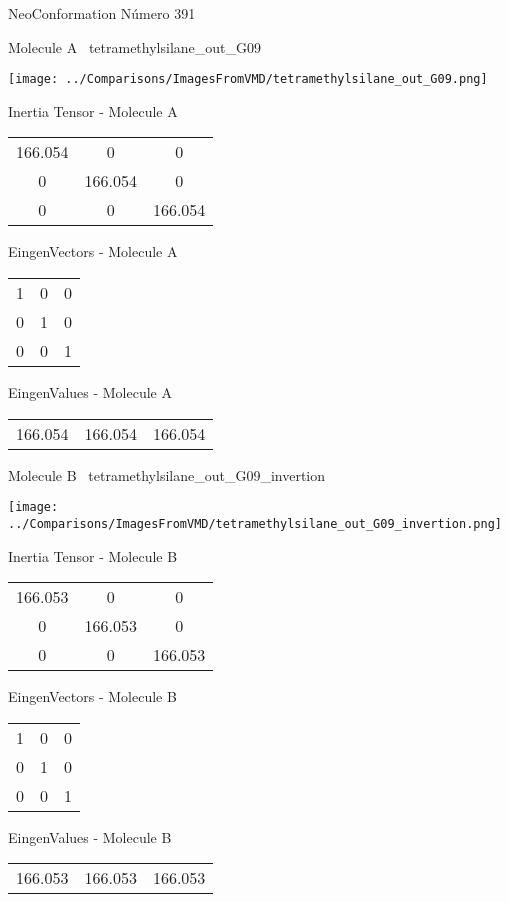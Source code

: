 \vtab[-3cm]
\begin{center}
{\large NeoConformation \tab Número 391}
\end{center}
\begin{multicols}{2}
\begin{center}

Molecule A \
tetramethylsilane\_out\_G09

\texttt{[image: ../Comparisons/ImagesFromVMD/tetramethylsilane\_out\_G09.png]}

Inertia Tensor - Molecule A \\
\begin{tabular}{|c c c|}
166.054	 & 	0	 & 	0	 \\
0	 & 	166.054	 & 	0	 \\
0	 & 	0	 & 	166.054
\end{tabular}

\vtab
 EingenVectors - Molecule A     \\
\begin{tabular}{|c c c|}
1	 & 	0	 & 	0	 \\
0	 & 	1	 & 	0	 \\
0	 & 	0	 & 	1
\end{tabular}

\vtab
 EingenValues - Molecule A     \\
\begin{tabular}{|c c c|}
166.054	 & 	166.054	 & 	166.054	 \\
\end{tabular}
\columnbreak

Molecule B \
tetramethylsilane\_out\_G09\_invertion

\texttt{[image: ../Comparisons/ImagesFromVMD/tetramethylsilane\_out\_G09\_invertion.png]}

Inertia Tensor - Molecule B \\
\begin{tabular}{|c c c|}
166.053	 & 	0	 & 	0	 \\
0	 & 	166.053	 & 	0	 \\
0	 & 	0	 & 	166.053
\end{tabular}

\vtab
 EingenVectors - Molecule B     \\
\begin{tabular}{|c c c|}
1	 & 	0	 & 	0	 \\
0	 & 	1	 & 	0	 \\
0	 & 	0	 & 	1
\end{tabular}

\vtab
 EingenValues - Molecule B     \\
\begin{tabular}{|c c c|}
166.053	 & 	166.053	 & 	166.053	 \\
\end{tabular}

\end{center}
\end{multicols}

